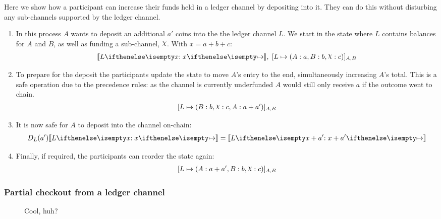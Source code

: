 \documentclass{article}
\begin{document}
Here we show how a participant can increase their funds held in a ledger channel by depositing into it.
They can do this without disturbing any sub-channels supported by the ledger channel.
\begin{enumerate}
  \item In this process $A$ wants to deposit an additional $a'$ coins into the the ledger channel $L$. We start in the state where $L$ contains balances for $A$ and $B$, as well as funding a sub-channel, $\rchi$. With $x = a + b + c$:
  \begin{align}
    \adj{\holds{L}{x}{}}, \; \finalizable{L}{\alloc{A: a, B: b, \rchi: c}}{A, B}
  \end{align}
  \item To prepare for the deposit the participants update the state to move $A$'s entry to the end, simultaneously increasing $A$'s total. This is a safe operation due to the precedence rules: as the channel is currently underfunded $A$ would still only receive $a$ if the outcome went to chain.
  \begin{align}
    \finalizable{L}{\alloc{B:b, \rchi: c, A: a + a'}}{A,B}
  \end{align}
  \item It is now safe for $A$ to deposit into the channel on-chain:
  \begin{align}
    D_L(a')\adj{\holds{L}{x}{}} = \adj{\holds{L}{x + a'}{}}
  \end{align}
  \item Finally, if required, the participants can reorder the state again:
  \begin{align}
    \finalizable{L}{\alloc{ A: a + a', B: b, \rchi: c}}{A,B}
  \end{align}
\end{enumerate}


\subsubsection{Partial checkout from a ledger channel}

\begin{figure}[h]\centering
  \caption{Cool, huh?}
\end{figure}
\end{document}
